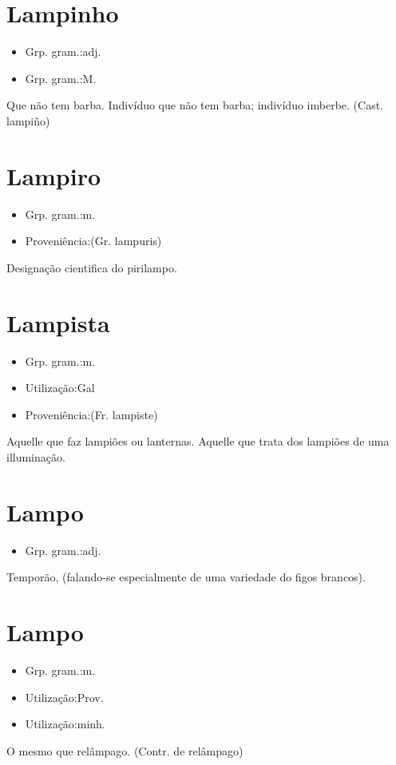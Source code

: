\section{Lampinho}
\begin{itemize}
\item {Grp. gram.:adj.}
\end{itemize}
\begin{itemize}
\item {Grp. gram.:M.}
\end{itemize}
Que não tem barba.
Indivíduo que não tem barba; indivíduo imberbe.
(Cast. \textunderscore lampiño\textunderscore )
\section{Lampiro}
\begin{itemize}
\item {Grp. gram.:m.}
\end{itemize}
\begin{itemize}
\item {Proveniência:(Gr. \textunderscore lampuris\textunderscore )}
\end{itemize}
Designação cientifica do pirilampo.
\section{Lampista}
\begin{itemize}
\item {Grp. gram.:m.}
\end{itemize}
\begin{itemize}
\item {Utilização:Gal}
\end{itemize}
\begin{itemize}
\item {Proveniência:(Fr. \textunderscore lampiste\textunderscore )}
\end{itemize}
Aquelle que faz lampiões ou lanternas.
Aquelle que trata dos lampiões de uma illuminação.
\section{Lampo}
\begin{itemize}
\item {Grp. gram.:adj.}
\end{itemize}
Temporão, (falando-se especialmente de uma variedade do figos brancos).
\section{Lampo}
\begin{itemize}
\item {Grp. gram.:m.}
\end{itemize}
\begin{itemize}
\item {Utilização:Prov.}
\end{itemize}
\begin{itemize}
\item {Utilização:minh.}
\end{itemize}
O mesmo que \textunderscore relâmpago\textunderscore .
(Contr. de \textunderscore relâmpago\textunderscore )
